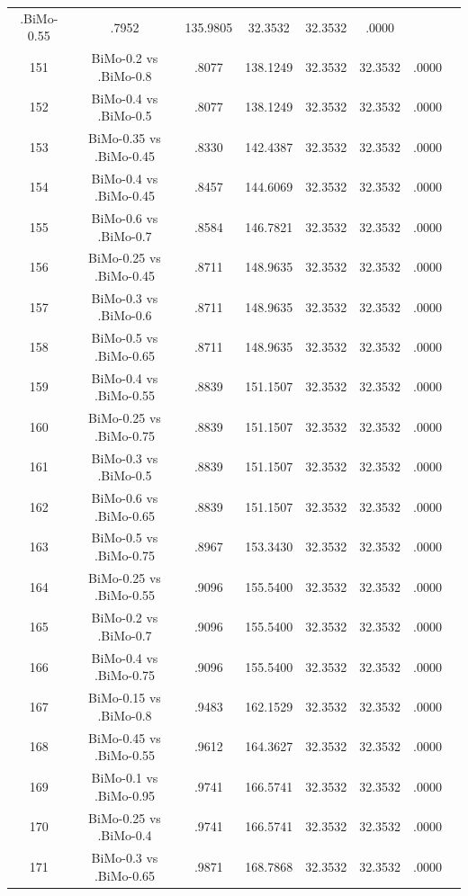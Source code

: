 \documentclass[a4paper,10pt]{article}
\begin{document}
\begin{landscape}
\begin{table}[!htp]
\begin{tabular}{cccccccc}
.BiMo-0.55&.7952&135.9805&32.3532&32.3532&.0000\\151&BiMo-0.2 vs .BiMo-0.8&.8077&138.1249&32.3532&32.3532&.0000\\152&BiMo-0.4 vs .BiMo-0.5&.8077&138.1249&32.3532&32.3532&.0000\\153&BiMo-0.35 vs .BiMo-0.45&.8330&142.4387&32.3532&32.3532&.0000\\154&BiMo-0.4 vs .BiMo-0.45&.8457&144.6069&32.3532&32.3532&.0000\\155&BiMo-0.6 vs .BiMo-0.7&.8584&146.7821&32.3532&32.3532&.0000\\156&BiMo-0.25 vs .BiMo-0.45&.8711&148.9635&32.3532&32.3532&.0000\\157&BiMo-0.3 vs .BiMo-0.6&.8711&148.9635&32.3532&32.3532&.0000\\158&BiMo-0.5 vs .BiMo-0.65&.8711&148.9635&32.3532&32.3532&.0000\\159&BiMo-0.4 vs .BiMo-0.55&.8839&151.1507&32.3532&32.3532&.0000\\160&BiMo-0.25 vs .BiMo-0.75&.8839&151.1507&32.3532&32.3532&.0000\\161&BiMo-0.3 vs .BiMo-0.5&.8839&151.1507&32.3532&32.3532&.0000\\162&BiMo-0.6 vs .BiMo-0.65&.8839&151.1507&32.3532&32.3532&.0000\\163&BiMo-0.5 vs .BiMo-0.75&.8967&153.3430&32.3532&32.3532&.0000\\164&BiMo-0.25 vs .BiMo-0.55&.9096&155.5400&32.3532&32.3532&.0000\\165&BiMo-0.2 vs .BiMo-0.7&.9096&155.5400&32.3532&32.3532&.0000\\166&BiMo-0.4 vs .BiMo-0.75&.9096&155.5400&32.3532&32.3532&.0000\\167&BiMo-0.15 vs .BiMo-0.8&.9483&162.1529&32.3532&32.3532&.0000\\168&BiMo-0.45 vs .BiMo-0.55&.9612&164.3627&32.3532&32.3532&.0000\\169&BiMo-0.1 vs .BiMo-0.95&.9741&166.5741&32.3532&32.3532&.0000\\170&BiMo-0.25 vs .BiMo-0.4&.9741&166.5741&32.3532&32.3532&.0000\\171&BiMo-0.3 vs .BiMo-0.65&.9871&168.7868&32.3532&32.3532&.0000\\\hline
\end{tabular}
\end{table}

\end{landscape}
\end{document}
